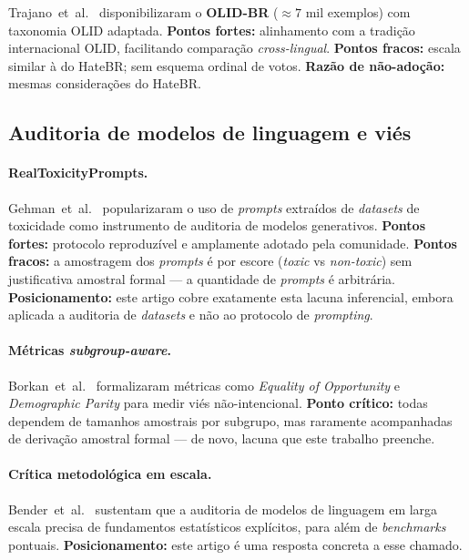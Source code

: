 Trajano~et~al.~\cite{trajano2024olid} disponibilizaram o
\textbf{OLID-BR} ($\approx 7$ mil exemplos) com taxonomia OLID adaptada.
\textbf{Pontos fortes:} alinhamento com a tradição internacional OLID,
facilitando comparação \textit{cross-lingual}. \textbf{Pontos fracos:}
escala similar à do HateBR; sem esquema ordinal de votos.
\textbf{Razão de não-adoção:} mesmas considerações do HateBR.

\subsection{Auditoria de modelos de linguagem e viés}

\paragraph{RealToxicityPrompts.}
Gehman~et~al.~\cite{gehman2020} popularizaram o uso de \textit{prompts}
extraídos de \textit{datasets} de toxicidade como instrumento de auditoria
de modelos generativos. \textbf{Pontos fortes:} protocolo reproduzível e
amplamente adotado pela comunidade. \textbf{Pontos fracos:} a amostragem dos
\textit{prompts} é por escore (\textit{toxic} vs \textit{non-toxic}) sem
justificativa amostral formal --- a quantidade de \textit{prompts} é
arbitrária. \textbf{Posicionamento:} este artigo cobre exatamente esta
lacuna inferencial, embora aplicada a auditoria de \textit{datasets} e não
ao protocolo de \textit{prompting}.

\paragraph{Métricas \textit{subgroup-aware}.}
Borkan~et~al.~\cite{borkan2019nuanced} formalizaram métricas como
\textit{Equality of Opportunity} e \textit{Demographic Parity} para medir
viés não-intencional. \textbf{Ponto crítico:} todas dependem de tamanhos
amostrais por subgrupo, mas raramente acompanhadas de derivação amostral
formal --- de novo, lacuna que este trabalho preenche.

\paragraph{Crítica metodológica em escala.}
Bender~et~al.~\cite{bender2021} sustentam que a auditoria de modelos de
linguagem em larga escala precisa de fundamentos estatísticos explícitos,
para além de \textit{benchmarks} pontuais. \textbf{Posicionamento:} este
artigo é uma resposta concreta a esse chamado.

